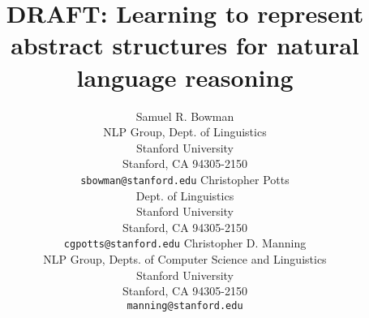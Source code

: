 \documentclass{article} %
\title{DRAFT: Learning to represent abstract structures for natural language reasoning}
\author{
Samuel R. Bowman \\
NLP Group, Dept. of Linguistics\\
Stanford University\\
Stanford, CA 94305-2150 \\
\texttt{sbowman@stanford.edu}
 \And
 Christopher Potts \\
Dept. of Linguistics\\
Stanford University\\
Stanford, CA 94305-2150 \\
\texttt{cgpotts@stanford.edu}
 \And
Christopher D. Manning \\
NLP Group,  Depts. of Computer Science and Linguistics\\
Stanford University\\
Stanford, CA 94305-2150 \\
\texttt{manning@stanford.edu}
}
\begin{document}
\maketitle














\small %
 
\end{document}
